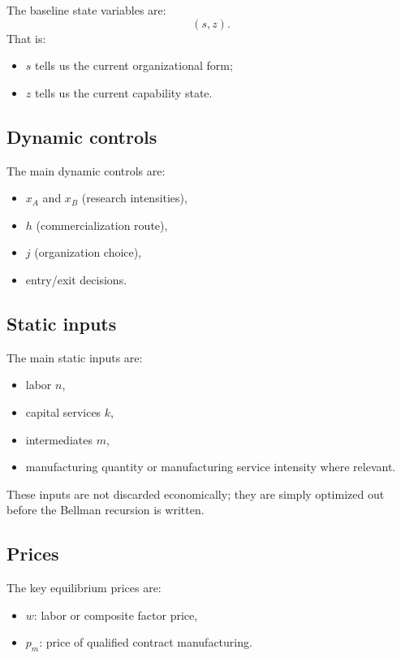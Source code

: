 \documentclass[12pt]{article}
\begin{document}
The baseline state variables are:
\[
(s,z).
\]
That is:
\begin{itemize}[leftmargin=2em]
    \item $s$ tells us the current organizational form;
    \item $z$ tells us the current capability state.
\end{itemize}

\subsection{Dynamic controls}

The main dynamic controls are:
\begin{itemize}[leftmargin=2em]
    \item $x_A$ and $x_B$ (research intensities),
    \item $h$ (commercialization route),
    \item $j$ (organization choice),
    \item entry/exit decisions.
\end{itemize}

\subsection{Static inputs}

The main static inputs are:
\begin{itemize}[leftmargin=2em]
    \item labor $n$,
    \item capital services $k$,
    \item intermediates $m$,
    \item manufacturing quantity or manufacturing service intensity where relevant.
\end{itemize}
These inputs are not discarded economically; they are simply optimized out before the
Bellman recursion is written.

\subsection{Prices}

The key equilibrium prices are:
\begin{itemize}[leftmargin=2em]
    \item $w$: labor or composite factor price,
    \item $p_m$: price of qualified contract manufacturing.
\end{itemize}
\end{document}
